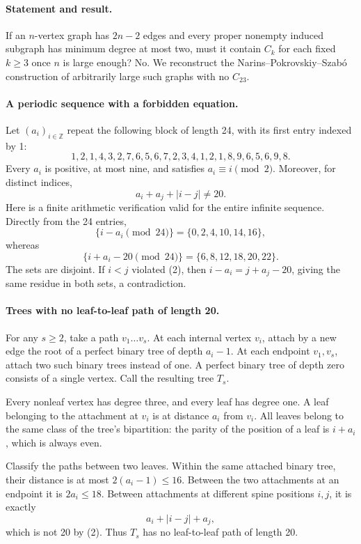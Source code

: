 \paragraph{Statement and result.}
If an \(n\)-vertex graph has \(2n-2\) edges and every proper nonempty induced subgraph has minimum degree at most two, must it contain \(C_k\) for each fixed \(k\geq3\) once \(n\) is large enough? No. We reconstruct the Narins--Pokrovskiy--Szab\'o construction of arbitrarily large such graphs with no \(C_{23}\).

\paragraph{A periodic sequence with a forbidden equation.}
Let \((a_i)_{i\in\mathbb Z}\) repeat the following block of length 24, with its first entry indexed by 1:
\[
 1,2,1,4,3,2,7,6,5,6,7,2,
 3,4,1,2,1,8,9,6,5,6,9,8.
\tag{1}
\]
Every \(a_i\) is positive, at most nine, and satisfies \(a_i\equiv i\pmod2\). Moreover, for distinct indices,
\[
 a_i+a_j+|i-j|\ne20.
\tag{2}
\]
Here is a finite arithmetic verification valid for the entire infinite sequence. Directly from the 24 entries,
\[
 \{i-a_i\pmod{24}\}=\{0,2,4,10,14,16\},
\]
whereas
\[
 \{i+a_i-20\pmod{24}\}=\{6,8,12,18,20,22\}.
\]
The sets are disjoint. If \(i<j\) violated (2), then \(i-a_i=j+a_j-20\), giving the same residue in both sets, a contradiction.

\paragraph{Trees with no leaf-to-leaf path of length 20.}
For any \(s\geq2\), take a path \(v_1\ldots v_s\). At each internal vertex \(v_i\), attach by a new edge the root of a perfect binary tree of depth \(a_i-1\). At each endpoint \(v_1,v_s\), attach two such binary trees instead of one. A perfect binary tree of depth zero consists of a single vertex. Call the resulting tree \(T_s\).

Every nonleaf vertex has degree three, and every leaf has degree one. A leaf belonging to the attachment at \(v_i\) is at distance \(a_i\) from \(v_i\). All leaves belong to the same class of the tree's bipartition: the parity of the position of a leaf is \(i+a_i\), which is always even.

Classify the paths between two leaves. Within the same attached binary tree, their distance is at most \(2(a_i-1)\leq16\). Between the two attachments at an endpoint it is \(2a_i\leq18\). Between attachments at different spine positions \(i,j\), it is exactly
\[
 a_i+|i-j|+a_j,
\]
which is not 20 by (2). Thus \(T_s\) has no leaf-to-leaf path of length 20.

